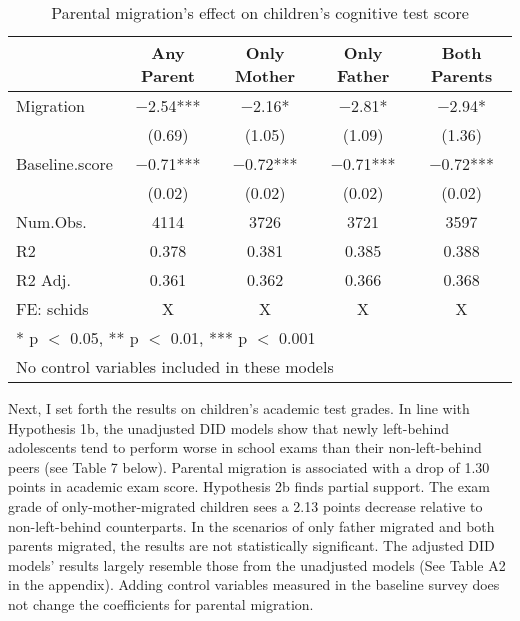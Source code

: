 \documentclass[
  man,floatsintext]{apa7}
\begin{document}
\begin{table}

\caption{Parental migration’s effect on children’s cognitive test score}
\centering
\begin{tabular}[t]{lcccc}
\toprule
  & Any Parent & Only Mother & Only Father & Both Parents\\
\midrule
Migration & \num{-2.54}*** & \num{-2.16}* & \num{-2.81}* & \num{-2.94}*\\
 & (\num{0.69}) & (\num{1.05}) & (\num{1.09}) & (\num{1.36})\\
Baseline.score & \num{-0.71}*** & \num{-0.72}*** & \num{-0.71}*** & \num{-0.72}***\\
 & (\num{0.02}) & (\num{0.02}) & (\num{0.02}) & (\num{0.02})\\
\midrule
Num.Obs. & \num{4114} & \num{3726} & \num{3721} & \num{3597}\\
R2 & \num{0.378} & \num{0.381} & \num{0.385} & \num{0.388}\\
R2 Adj. & \num{0.361} & \num{0.362} & \num{0.366} & \num{0.368}\\
FE: schids & X & X & X & X\\
\bottomrule
\multicolumn{5}{l}{\rule{0pt}{1em}* p $<$ 0.05, ** p $<$ 0.01, *** p $<$ 0.001}\\
\multicolumn{5}{l}{\rule{0pt}{1em}No control variables included in these models}\\
\end{tabular}
\end{table}

Next, I set forth the results on children's academic test grades. In line with Hypothesis 1b, the unadjusted DID models show that newly left-behind adolescents tend to perform worse in school exams than their non-left-behind peers (see Table 7 below). Parental migration is associated with a drop of 1.30 points in academic exam score. Hypothesis 2b finds partial support. The exam grade of only-mother-migrated children sees a 2.13 points decrease relative to non-left-behind counterparts. In the scenarios of only father migrated and both parents migrated, the results are not statistically significant. The adjusted DID models' results largely resemble those from the unadjusted models (See Table A2 in the appendix). Adding control variables measured in the baseline survey does not change the coefficients for parental migration.

\newpage
\end{document}
